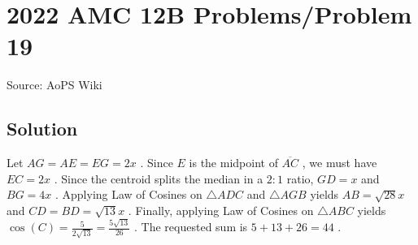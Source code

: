 \documentclass[12pt]{article}
\begin{document}
\section*{{2022 AMC 12B Problems/Problem 19}}
Source: AoPS Wiki

\subsection*{Solution}
Let $AG=AE=EG=2x$ . Since $E$ is the midpoint of $\overline{AC}$ , we must have $EC=2x$ . Since the centroid splits the median in a $2:1$ ratio, $GD=x$ and $BG=4x$ . Applying Law of Cosines on $\triangle ADC$ and $\triangle{}AGB$ yields $AB=\sqrt{28}x$ and $CD=BD=\sqrt{13}x$ . Finally, applying Law of Cosines on $\triangle ABC$ yields $\cos(C)=\frac{5}{2\sqrt{13}}=\frac{5\sqrt{13}}{26}$ . The requested sum is $5+13+26=44$ .
\end{document}
